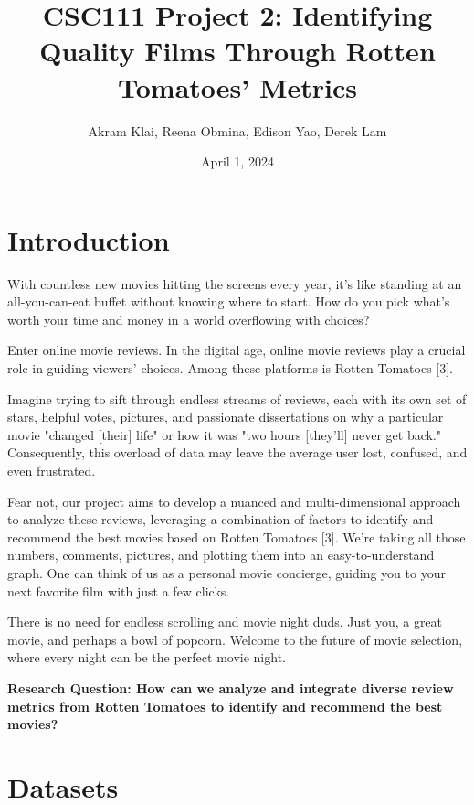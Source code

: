 \documentclass[fontsize=11pt]{article}
\title{\textbf{CSC111 Project 2: Identifying Quality Films Through Rotten Tomatoes' Metrics}}
\author{Akram Klai, Reena Obmina, Edison Yao, Derek Lam}
\date{April 1, 2024}
\begin{document}
\maketitle

\section*{Introduction}

\noindent With countless new movies hitting the screens every year, it's like standing at an all-you-can-eat buffet without knowing where to start. How do you pick what's worth your time and money in a world overflowing with choices?
\vspace{0.5cm}

\noindent Enter online movie reviews. In the digital age, online movie reviews play a crucial role in guiding viewers' choices. Among these platforms is Rotten Tomatoes [3]. 
\vspace{0.5cm}

\noindent Imagine trying to sift through endless streams of reviews, each with its own set of stars, helpful votes, pictures, and passionate dissertations on why a particular movie "changed [their] life" or how it was "two hours [they'll] never get back." Consequently, this overload of data may leave the average user lost, confused, and even frustrated.
\vspace{0.5cm}

\noindent Fear not, our project aims to develop a nuanced and multi-dimensional approach to analyze these reviews, leveraging a combination of factors to identify and recommend the best movies based on Rotten Tomatoes [3]. We're taking all those numbers, comments, pictures, and plotting them into an easy-to-understand graph. One can think of us as a personal movie concierge, guiding you to your next favorite film with just a few clicks.
\vspace{0.5cm}

\noindent There is no need for endless scrolling and movie night duds. Just you, a great movie, and perhaps a bowl of popcorn. Welcome to the future of movie selection, where every night can be the perfect movie night.
\vspace{0.5cm}

\noindent \textbf{Research Question: How can we analyze and integrate diverse review metrics from Rotten Tomatoes to identify and recommend the best movies?}

\section*{Datasets}
\end{document}
